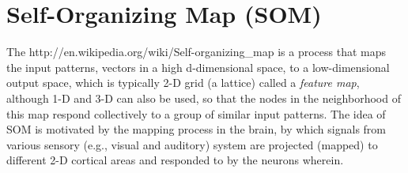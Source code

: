 \documentclass{article}
\begin{document}

\begin{comment}
As shown on the left of the figure, a set of $C=7$ clusters are formed 
by $7\times 40$ data points (blue circles) in $N=4$ dimensional space. A 
competitive learning network with $M=C=7$ output nodes is then used to do 
clustering of the dataset. The $M$ weight vectors (red dots) are randomly 
generated in the 4-D space. After competitive learning, they moved from 
their initial positions (left) to the means of the clusters (right), 
thereby representing the clusters. To visualize the data points and the
weight vectors in the 4-D space is projected by the
\htmladdnormallink{PCA (KLT) transform}{http://fourier.eng.hmc.edu/e161/lectures/klt/index.html}
to 3-D and 2-D spaces:

\htmladdimg{../figures/CompetitiveKLTmapping3.png}

Ideally, the number of output nodes $m$ should be the same as the number 
of clusters that exist in the dataset, so that each cluster of the dataset
can be represented by one of the nodes after the competitive learning is 
complete. However, the number of clusters is typically unknown ahead of 
time. In such cases, one can carry out the competitive learning multiple 
times, each time using a different $m$, and then compare the clustering
results to see which $m$ value fits the data the best. Specifically, how 
well the clustering results reflect the intrisic structure of the dataset,
and, in general, how well the data points are clustered can be 
quantitatively measured in terms of the scatteredness of the data point 
belonging to each cluster, in comparison to the total scatteredness of 
the entire dataset, as discussed \htmladdnormallink{here}{node1.html}.
Such quantitative measurement can be used as a criterion for the results 
of different clustering algorithms.
\end{comment}

\section{Self-Organizing Map (SOM)}

The 
{http://en.wikipedia.org/wiki/Self-organizing_map} is a process that 
maps the input patterns, vectors in a high d-dimensional space, to a 
low-dimensional output space, which is typically 2-D grid (a lattice)
called a {\em feature map}, although 1-D and 3-D can also be used, so 
that the nodes in the neighborhood of this map respond collectively to 
a group of similar input patterns. The idea of SOM is motivated by the 
mapping process in the brain, by which signals from various sensory 
(e.g., visual and auditory) system are projected (mapped) to different 
2-D cortical areas and responded to by the neurons wherein.
\end{document}
